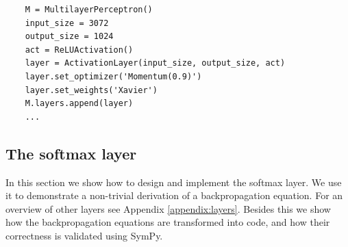 \documentclass[twoside,11pt]{article}
\begin{document}
\begin{lstfloat}[!ht]
\begin{lstlisting}
    M = MultilayerPerceptron()
    input_size = 3072
    output_size = 1024
    act = ReLUActivation()
    layer = ActivationLayer(input_size, output_size, act)
    layer.set_optimizer('Momentum(0.9)')
    layer.set_weights('Xavier')   
    M.layers.append(layer)
    ...
\end{lstlisting}
\caption{Multilayer perceptron construction. The functions \texttt{set\_optimizer} and \texttt{set\_weigths} are offered as convenience functions to simplify the work. It is also possible to
initialize the attributes manually.}
\label{listing:mlp-construction}
\end{lstfloat}

\subsection{The softmax layer} \label{section:softmax-layer}
In this section we show how to design and implement the softmax layer. We use it to demonstrate a non-trivial derivation of a backpropagation equation. For an overview of other layers see Appendix \ref{appendix:layers}. Besides this we show how the backpropagation equations are transformed into code, and how their correctness is validated using SymPy.
\end{document}
